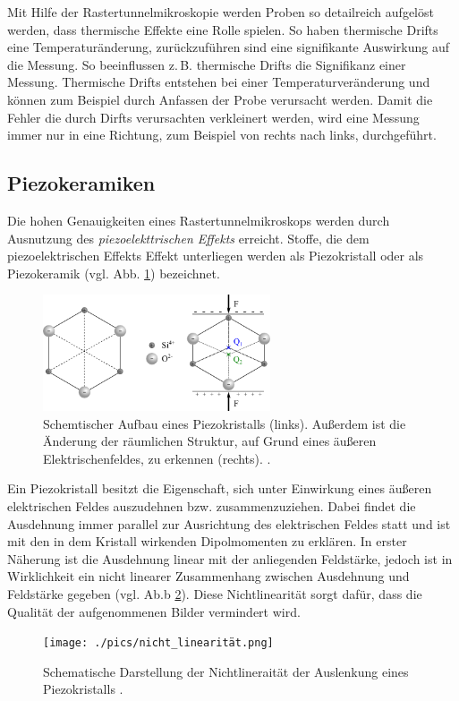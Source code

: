 Mit Hilfe der Rastertunnelmikroskopie werden Proben so detailreich aufgelöst werden, dass thermische Effekte eine Rolle spielen.
So haben thermische Drifts eine Temperaturänderung, zurückzuführen sind eine signifikante Auswirkung auf die Messung.
So beeinflussen z.\,B. thermische Drifts die Signifikanz einer Messung.
Thermische Drifts entstehen bei einer Temperaturveränderung und können zum Beispiel
durch Anfassen der Probe verursacht werden.
Damit die Fehler die durch Dirfts verursachten verkleinert werden,
wird eine Messung immer nur in eine Richtung, zum Beispiel von rechts nach links, durchgeführt.

\subsection{Piezokeramiken}

Die hohen Genauigkeiten eines Rastertunnelmikroskops werden durch Ausnutzung des
\emph{piezoelekttrischen Effekts} erreicht.
Stoffe, die dem piezoelektrischen Effekts Effekt unterliegen werden als Piezokristall
oder als Piezokeramik (vgl. Abb. \ref{fig: piezo}) bezeichnet.
\begin{figure}[!h]
  \centering
  \includegraphics[width=0.6\textwidth]{./pics/piezo.png}
  \caption{Schemtischer Aufbau eines Piezokristalls (links). Außerdem ist die Änderung der räumlichen Struktur, auf Grund eines
  äußeren Elektrischenfeldes, zu erkennen (rechts). \cite{piezo}.}
  \label{fig: piezo}
\end{figure}
Ein Piezokristall besitzt die Eigenschaft, sich unter Einwirkung eines äußeren
elektrischen Feldes auszudehnen bzw. zusammenzuziehen. Dabei findet die Ausdehnung immer parallel zur
Ausrichtung des elektrischen Feldes statt und ist mit den in dem Kristall wirkenden
Dipolmomenten zu erklären. In erster Näherung ist die Ausdehnung linear mit der anliegenden Feldstärke,
jedoch ist in Wirklichkeit ein nicht linearer Zusammenhang zwischen Ausdehnung und Feldstärke
gegeben (vgl. Ab.b \ref{fig: non_linear}). Diese Nichtlinearität sorgt dafür, dass die Qualität der aufgenommenen Bilder
vermindert wird.
\begin{figure}[!h]
  \centering
  \texttt{[image: ./pics/nicht\_linearität.png]}
  \caption{Schematische Darstellung der Nichtlineraität der Auslenkung eines Piezokristalls \cite{rtm}.}
  \label{fig: non_linear}
\end{figure}

